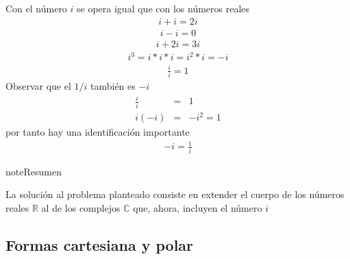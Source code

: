 \documentclass[letterpaper,10pt,english]{jupyterBook}
\begin{document}
\sphinxAtStartPar
Con el número \(i\) se opera igual que con los números reales
\begin{equation*}
\begin{split} i + i = 2i \end{split}
\end{equation*}\begin{equation*}
\begin{split} i - i = 0 \end{split}
\end{equation*}\begin{equation*}
\begin{split} i + 2i = 3 i\end{split}
\end{equation*}\begin{equation*}
\begin{split}i^3  = i*i*i = i^2 * i = -i\end{split}
\end{equation*}\begin{equation*}
\begin{split}\frac{i}{i} = 1\end{split}
\end{equation*}
\sphinxAtStartPar
Observar que el   \(1/i\) también es \(-i\)
\label{equation:docs/Part_01_Formalismo/Chapter_01_02_Formalismo_matemático/01_01_Numeros_Complejos_myst:bc7d0c4d-f5a5-4ced-8876-c1ee9f3d4287}\begin{eqnarray}
\frac{i}{i}  &=&   1 \nonumber\\
i (-i) &=& - i^2  =  1
\end{eqnarray}
\sphinxAtStartPar
por tanto hay una identificación importante
\begin{equation*}
\begin{split} -i = \frac{1}{i} \end{split}
\end{equation*}
\begin{sphinxadmonition}{note}{Resumen}

\sphinxAtStartPar
La solución al problema planteado consiste en extender el cuerpo de los números reales \({\mathbb R}\) al de los complejos \({\mathbb C}\) que, ahora, incluyen el número \(i\)
\end{sphinxadmonition}


\subsection{Formas cartesiana y polar}
\label{\detokenize{docs/Part_01_Formalismo/Chapter_01_02_Formalismo_matem_xe1tico/01_01_Numeros_Complejos_myst:formas-cartesiana-y-polar}}
\end{document}
